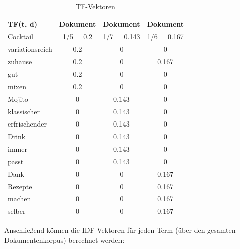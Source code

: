 \begin{table}[H]
    \centering
    \begin{tabular}{l|c|c|c}
        TF(t, d)          & Dokument \textnumero 1 & Dokument \textnumero 2 & Dokument \textnumero 3 \\
        \hline
        Cocktail            & 1/5 = 0.2             & 1/7 = 0.143      & 1/6 = 0.167 \\
        \hline
        variationsreich & 0.2             & 0 & 0      \\
        \hline
        zuhause                & 0.2           & 0    & 0.167 \\
        \hline
        gut                  & 0.2             & 0      & 0  \\
        \hline
        mixen            & 0.2             & 0      & 0 \\
        \hline
        Mojito & 0             & 0.143 & 0      \\
        \hline
        klassischer                & 0           & 0.143    & 0 \\
        \hline
        erfrischender                  & 0             & 0.143      & 0   \\
        \hline
        Drink            & 0             & 0.143      & 0 \\
        \hline
        immer & 0             & 0.143 & 0      \\
        \hline
        passt                & 0          & 0.143    & 0 \\
        \hline
        Dank                  & 0             & 0      & 0.167   \\
        \hline
        Rezepte            & 0             & 0      & 0.167 \\
        \hline
        machen & 0             & 0 & 0.167      \\
        \hline
        selber                & 0           & 0    & 0.167\\
    \end{tabular}
    \caption{\label{table:TF_Vektoren}\ac{TF}-Vektoren}
\end{table}
\noindent
Anschließend können die \ac{IDF}-Vektoren für jeden Term (über den gesamten Dokumentenkorpus) berechnet werden:
